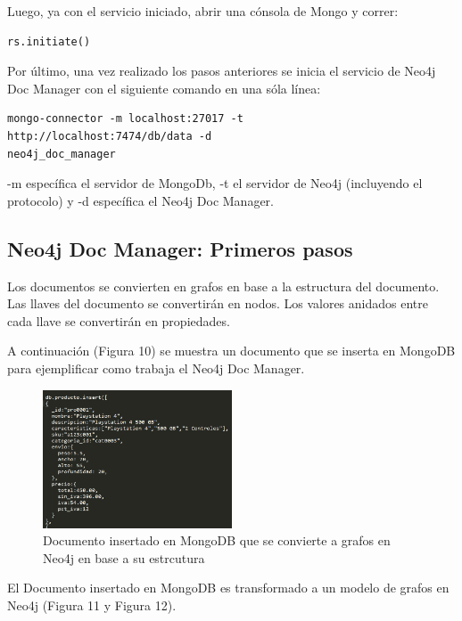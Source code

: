 \documentclass[conference]{IEEEtran}
\begin{document}
Luego, ya con el servicio iniciado, abrir una c\'onsola de Mongo y correr:

\begin{lstlisting}
rs.initiate()
\end{lstlisting}

Por \'ultimo, una vez realizado los pasos anteriores se inicia el servicio de Neo4j Doc Manager con el siguiente comando en una s\'ola l\'inea:

\begin{lstlisting}
mongo-connector -m localhost:27017 -t
http://localhost:7474/db/data -d
neo4j_doc_manager
\end{lstlisting}

-m espec\'ifica el servidor de MongoDb, -t el servidor de Neo4j (incluyendo el protocolo) y -d espec\'ifica el Neo4j Doc Manager.

\subsection*{Neo4j Doc Manager: Primeros pasos}

Los documentos se convierten en grafos en base a la estructura del documento. Las llaves del documento se convertir\'an en nodos. Los valores anidados entre cada llave se convertir\'an en propiedades.

A continuaci\'on (Figura 10) se muestra un documento que se inserta en MongoDB para ejemplificar como trabaja el Neo4j Doc Manager.

\begin{figure}[!h]
\centering
\includegraphics[width=0.5\textwidth]{10}
\caption{Documento insertado en MongoDB que se convierte a grafos en Neo4j en base a su estrcutura}
\label{}
\end{figure}

El Documento insertado en MongoDB es transformado a un modelo de grafos en Neo4j (Figura 11 y Figura 12).\\
\end{document}

